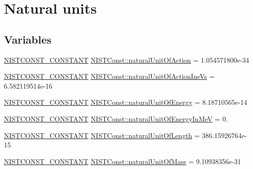 \hypertarget{group___n_i_s_t_const-_natural_unit}{}\section{Natural units}
\label{group___n_i_s_t_const-_natural_unit}
\subsection*{Variables}
\begin{DoxyCompactItemize}
\item 
\mbox{\hyperlink{group___n_i_s_t_const-_macros_ga2b0fc1d7452373f816175dd86ce26729}{N\+I\+S\+T\+C\+O\+N\+S\+T\+\_\+\+C\+O\+N\+S\+T\+A\+NT}} \mbox{\hyperlink{group___n_i_s_t_const-_natural_unit_ga52ce10be6f28a0403e43f42445dd5bdb}{N\+I\+S\+T\+Const\+::natural\+Unit\+Of\+Action}} = 1.\+054571800e-\/34
\item 
\mbox{\hyperlink{group___n_i_s_t_const-_macros_ga2b0fc1d7452373f816175dd86ce26729}{N\+I\+S\+T\+C\+O\+N\+S\+T\+\_\+\+C\+O\+N\+S\+T\+A\+NT}} \mbox{\hyperlink{group___n_i_s_t_const-_natural_unit_gadf0b7bf18e0371c6528e8532ae1b9984}{N\+I\+S\+T\+Const\+::natural\+Unit\+Of\+Action\+Ine\+Vs}} = 6.\+582119514e-\/16
\item 
\mbox{\hyperlink{group___n_i_s_t_const-_macros_ga2b0fc1d7452373f816175dd86ce26729}{N\+I\+S\+T\+C\+O\+N\+S\+T\+\_\+\+C\+O\+N\+S\+T\+A\+NT}} \mbox{\hyperlink{group___n_i_s_t_const-_natural_unit_gafbdfe6f0b94bdc194fcb719c7a09ad01}{N\+I\+S\+T\+Const\+::natural\+Unit\+Of\+Energy}} = 8.\+18710565e-\/14
\item 
\mbox{\hyperlink{group___n_i_s_t_const-_macros_ga2b0fc1d7452373f816175dd86ce26729}{N\+I\+S\+T\+C\+O\+N\+S\+T\+\_\+\+C\+O\+N\+S\+T\+A\+NT}} \mbox{\hyperlink{group___n_i_s_t_const-_natural_unit_gae7af288f55f49ca09dae5a25f69941c6}{N\+I\+S\+T\+Const\+::natural\+Unit\+Of\+Energy\+In\+MeV}} = 0.
\item 
\mbox{\hyperlink{group___n_i_s_t_const-_macros_ga2b0fc1d7452373f816175dd86ce26729}{N\+I\+S\+T\+C\+O\+N\+S\+T\+\_\+\+C\+O\+N\+S\+T\+A\+NT}} \mbox{\hyperlink{group___n_i_s_t_const-_natural_unit_ga746fb3dd81ed728c99e5f78ccbc3c15f}{N\+I\+S\+T\+Const\+::natural\+Unit\+Of\+Length}} = 386.\+15926764e-\/15
\item 
\mbox{\hyperlink{group___n_i_s_t_const-_macros_ga2b0fc1d7452373f816175dd86ce26729}{N\+I\+S\+T\+C\+O\+N\+S\+T\+\_\+\+C\+O\+N\+S\+T\+A\+NT}} \mbox{\hyperlink{group___n_i_s_t_const-_natural_unit_gaf95361f1122cce12b7ad6fa77e75bcd5}{N\+I\+S\+T\+Const\+::natural\+Unit\+Of\+Mass}} = 9.\+10938356e-\/31

\end{DoxyCompactItemize}
